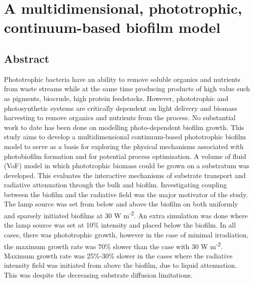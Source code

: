 \chapter[A multidimensional, phototrophic, continuum-based biofilm model]{A multidimensional, phototrophic, continuum-based biofilm model}
\label{chap:ch4}	%
\pagestyle{headings}

\section*{Abstract}
Phototrophic bacteria have an ability to remove soluble organics and nutrients from waste streams while at the same time producing products of high value such as pigments, biocrude, high protein feedstocks. 
However, phototrophic and photosynthetic systems are critically dependent on light delivery and biomass harvesting to remove organics and nutrients from the process.
No substantial work to date has been done on modelling photo-dependent biofilm growth.
This study aims to develop a multidimensional continuum-based phototrophic biofilm model to serve as a basis for exploring the physical mechanisms associated with photobiofilm formation and for potential process optimisation. 
A volume of fluid (VoF) model in which phototrophic biomass could be grown on a substratum was developed. 
This evaluates the interactive mechanisms of substrate transport and radiative attenuation through the bulk and biofilm. 
Investigating coupling between the biofilm and the radiative field was the major motivator of the study. 
The lamp source was set from below and above the biofilm on both uniformly and sparsely initiated biofilms at 30 W m\textsuperscript{-2}. An extra simulation was done where the lamp source was set at 10\% intensity and placed below the biofilm. In all cases, there was phototrophic growth, however in the case of minimal irradiation, the maximum growth rate was 70\% slower than the case with 30 W m\textsuperscript{-2}. 
Maximum growth rate was 25\%-30\% slower in the cases where the radiative intensity field was initiated from above the biofilm, due to liquid attenuation. This was despite the decreasing substrate diffusion limitations. 

